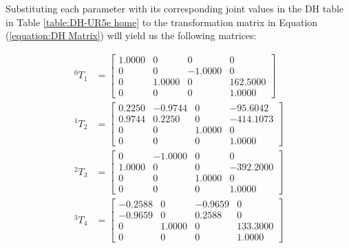 \documentclass[12pt]{article}
\begin{document}
Substituting each parameter with its corresponding joint values in the DH table in Table \ref{table:DH-UR5e home} to the transformation matrix in Equation (\ref{equation:DH Matrix}) will yield us the following matrices:

\begin{equation*}
    \begin{split}
        ^{0}T_{1} & = \begin{bmatrix}
                          1.0000 & 0      & 0       & 0        \\
                          0      & 0      & -1.0000 & 0        \\
                          0      & 1.0000 & 0       & 162.5000 \\
                          0      & 0      & 0       & 1.0000
                      \end{bmatrix}  \\
        ^{1}T_{2} & = \begin{bmatrix}
                          0.2250 & -0.9744 & 0      & -95.6042  \\
                          0.9744 & 0.2250  & 0      & -414.1073 \\
                          0      & 0       & 1.0000 & 0         \\
                          0      & 0       & 0      & 1.0000
                      \end{bmatrix} \\
        ^{2}T_{3} & = \begin{bmatrix}
                          0      & -1.0000 & 0      & 0         \\
                          1.0000 & 0       & 0      & -392.2000 \\
                          0      & 0       & 1.0000 & 0         \\
                          0      & 0       & 0      & 1.0000
                      \end{bmatrix} \\
        ^{3}T_{4} & = \begin{bmatrix}
                          -0.2588 & 0      & -0.9659 & 0        \\
                          -0.9659 & 0      & 0.2588  & 0        \\
                          0       & 1.0000 & 0       & 133.3000 \\
                          0       & 0      & 0       & 1.0000
                      \end{bmatrix} \\

\end{split}
\end{equation*}
\end{document}

